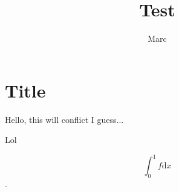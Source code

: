 \documentclass{article}
\begin{document}
\author{Marc}
\title{Test}
\maketitle

\section{Title}
\label{sec:title}
Hello, this will conflict I guess...

Lol


$$ \int_0^1 f \mathrm{d}x $$.
\end{document}
